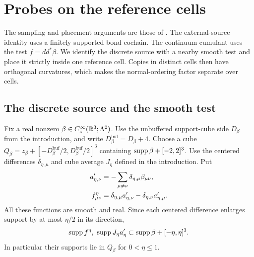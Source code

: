 \section{Probes on the reference cells}\label{sec:reference-cells}

The sampling and placement arguments are those of
\cite[\S19]{QED3Master}. The external-source identity uses a finitely supported bond cochain.
The continuum cumulant uses the test $f=dd^*\beta$. We identify the
discrete source with a nearby smooth test and place it strictly inside
one reference cell. Copies in distinct cells then have orthogonal
curvatures, which makes the normal-ordering factor separate over cells.

\subsection{The discrete source and the smooth test}

Fix a real nonzero $\beta\in C_c^\infty(\mathbb R^3;\Lambda^2)$.
Use the unbuffered support-cube side $D_\beta$ from the introduction,
and write
$D_\beta^{\mathrm{buf}}=D_\beta+4$. Choose a cube
$Q_\beta=z_\beta+[-D_\beta^{\mathrm{buf}}/2,
D_\beta^{\mathrm{buf}}/2]^3$ containing
$\operatorname{supp}\beta+[-2,2]^3$. Use the centered differences
$\delta_{\eta,\mu}$ and cube average $J_\eta$ defined in the introduction.
Put
\begin{align}
 a'_{\eta,\nu}&=-\sum_{\mu\ne\nu}
                          \delta_{\eta,\mu}\beta_{\mu\nu},\notag\\
 f^\eta_{\mu\nu}&=\delta_{\eta,\mu}a'_{\eta,\nu}
                         -\delta_{\eta,\nu}a'_{\eta,\mu}.
                                      \label{eq:cells-smooth-test}
\end{align}
All these functions are smooth and real. Since each centered
difference enlarges support by at most $\eta/2$ in its direction,
\[
 \operatorname{supp} f^\eta,\ \operatorname{supp} J_\eta a'_\eta
                   \subset\operatorname{supp}\beta+[-\eta,\eta]^3.
\]
In particular their supports lie in $Q_\beta$ for $0<\eta\le1$.

